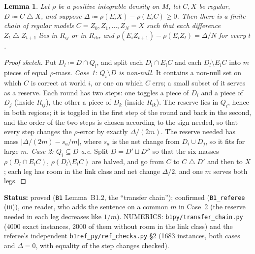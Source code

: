 \documentclass[11pt]{article}
\newtheorem{lemma}[theorem]{Lemma}
\theoremstyle{definition}
\theoremstyle{remark}
\newcommand{\sd}{\mathbin{\triangle}}
\newcommand{\src}[1]{\texttt{#1}}
\newcommand{\status}[1]{\par\smallskip\noindent\textbf{Status:} #1\par\smallskip}
\begin{document}
\begin{lemma}\label{lem:B12}
Let $\rho$ be a positive integrable density on $M$, let $C,X$ be regular, $D\coloneqq C\sd X$, and suppose $\Delta\coloneqq\rho(E_iX)-\rho(E_iC)\ge0$. Then there is a finite chain of regular models $C=Z_0,Z_1,\dots,Z_N=X$ such that each difference $Z_t\sd Z_{t+1}$ lies in $R_{ij}$ or in $R_{ik}$, and $\rho(E_iZ_{t+1})-\rho(E_iZ_t)=\Delta/N$ for every $t$.
\end{lemma}
\begin{proof}[Proof sketch]
Put $D_l\coloneqq D\cap Q_l$, and split each $D_l\cap E_iC$ and each $D_l\setminus E_iC$ into $m$ pieces of equal $\rho$-mass. \emph{Case 1: $Q_i\setminus D$ is non-null.} It contains a non-null set on which $C$ is correct at world $i$, or one on which $C$ errs; a small subset of it serves as a reserve. Each round has two steps: one toggles a piece of $D_i$ and a piece of $D_j$ (inside $R_{ij}$), the other a piece of $D_k$ (inside $R_{ik}$). The reserve lies in $Q_i$, hence in both regions; it is toggled in the first step of the round and back in the second, and the order of the two steps is chosen according to the sign needed, so that every step changes the $\rho$-error by exactly $\Delta/(2m)$. The reserve needed has mass $|\Delta/(2m)-s_a/m|$, where $s_a$ is the net change from $D_i\cup D_j$, so it fits for large $m$. \emph{Case 2: $Q_i\subseteq D$ a.e.} Split $D=D'\sqcup D''$ so that the six masses $\rho(D_l\cap E_iC)$, $\rho(D_l\setminus E_iC)$ are halved, and go from $C$ to $C\sd D'$ and then to $X$; each leg has room in the link class and net change $\Delta/2$, and one $m$ serves both legs.
\end{proof}
\status{proved (\src{B1} Lemma~B1.2, the ``transfer chain''); confirmed (\src{B1\_referee} (iii)), one reader, who adds the sentence on a common $m$ in Case~2 (the reserve needed in each leg decreases like $1/m$). NUMERICS: \src{b1py/transfer\_chain.py} (4000 exact instances, 2000 of them without room in the link class) and the referee's independent \src{b1ref\_py/ref\_checks.py} \S2 (1683 instances, both cases and $\Delta=0$, with equality of the step changes checked).}
\end{document}
